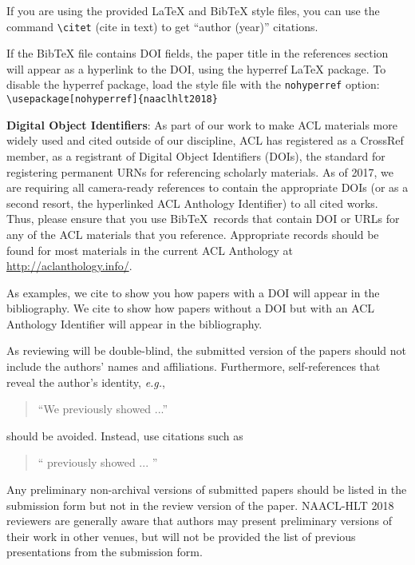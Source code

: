 \documentclass[11pt,a4paper]{article}
\begin{document}
If you are using the provided \LaTeX{} and Bib\TeX{} style files, you
can use the command \verb|\citet| (cite in text)
to get ``author (year)'' citations.

If the Bib\TeX{} file contains DOI fields, the paper
title in the references section will appear as a hyperlink
to the DOI, using the hyperref \LaTeX{} package.
To disable the hyperref package, load the style file
with the \verb|nohyperref| option: \\{\small
\verb|\usepackage[nohyperref]{naaclhlt2018}|}


\textbf{Digital Object Identifiers}:  As part of our work to make ACL
materials more widely used and cited outside of our discipline, ACL
has registered as a CrossRef member, as a registrant of Digital Object
Identifiers (DOIs), the standard for registering permanent URNs for
referencing scholarly materials.  As of 2017, we are requiring all
camera-ready references to contain the appropriate DOIs (or as a
second resort, the hyperlinked ACL Anthology Identifier) to all cited
works.  Thus, please ensure that you use Bib\TeX\ records that contain
DOI or URLs for any of the ACL materials that you reference.
Appropriate records should be found for most materials in the current
ACL Anthology at \url{http://aclanthology.info/}.

As examples, we cite \cite{P16-1001} to show you how papers with a DOI
will appear in the bibliography.  We cite \cite{C14-1001} to show how
papers without a DOI but with an ACL Anthology Identifier will appear
in the bibliography.  

As reviewing will be double-blind, the submitted version of the papers
should not include the authors' names and affiliations. Furthermore,
self-references that reveal the author's identity, {\em e.g.},
\begin{quote}
``We previously showed \cite{Gusfield:97} ...''  
\end{quote}
should be avoided. Instead, use citations such as 
\begin{quote}
``\citeauthor{Gusfield:97} 
previously showed ... ''
\end{quote}

Any preliminary non-archival versions of submitted papers should be listed in the submission form but not in the review version of the paper. NAACL-HLT 2018 reviewers are generally aware that authors may present preliminary versions of their work in other venues, but will not be provided the list of previous presentations from the submission form. 
\end{document}
